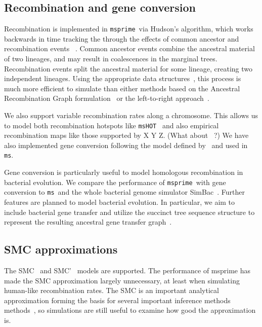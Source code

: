 \documentclass{article}
\newcommand{\msprime}[0]{\texttt{msprime}}
\newcommand{\ms}[0]{\texttt{ms}}
\newcommand{\msprime}[0]{{\texttt{msprime} }}
\newcommand{\ms}[0]{{\texttt{ms} }}
\begin{document}
\subsection*{Recombination and gene conversion}
Recombination is implemented in \msprime\ via
Hudson's algorithm, which
works backwards in time tracking the
through the effects of common ancestor and recombination events
~\citep{hudson1983properties,hudson1990gene,kelleher2016efficient}. Common
ancestor events combine the ancestral material of two lineages, and may
 result in coalescences in the marginal trees. Recombination events
split the ancestral material for some lineage, creating two independent
lineages. Using the appropriate data structures~\citep{kelleher2016efficient},
this process is much more efficient to simulate than either
methods based on the Ancestral Recombination Graph
formulation~\citep{griffiths1991two,griffiths1997ancestral}
or the left-to-right approach~\citep{wiuf1999recombination,wiuf1999ancestry}.


We also support variable recombination rates along a chromosome.
This allows us to model both recombination hotspots like
\texttt{msHOT}~\citep{hellenthal2007mshot} and also empirical
recombination maps like those supported by X Y Z.
(What about ~\cite{wang2014new}?)
We have also implemented gene
conversion following the model defined by~\cite{wiuf2000coalescent}
and used in \ms.

Gene conversion is particularly useful to model homologous recombination in bacterial evolution.
We compare the performance of \msprime\ with gene conversion to \ms\ and
the whole bacterial genome simulator SimBac~\citep{brown2016simbac}.
Further features are planned to model bacterial evolution. In particular, we
aim to include bacterial gene transfer and utilize the succinct tree sequence structure
to represent the resulting ancestral gene transfer graph~\citep{baumdicker2014AGTG}.

\subsection*{SMC approximations}

The SMC~\citep{mcvean2005approximating} and SMC'~\citep{marjoram2006fast}
models are supported.
The performance of msprime has made the SMC
approximation largely unnecessary, at least when simulating human-like
recombination rates. The SMC is an important analytical approximation
forming the basis for several important inference methods
methods~\citep{
li2011inference,
harris2013inferring,
sheehan2013estimating,
schiffels2014inferring,
carmi2014renewal,
rasmussen2014genome,
zheng2014bayesian,
terhorst2017robust},
so simulations are still useful to examine  how good the approximation
is.
\end{document}
